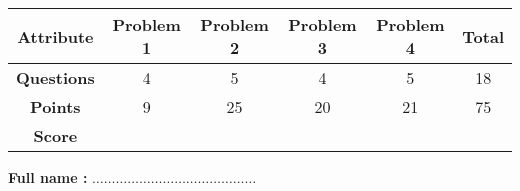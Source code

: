 \documentclass[article,12pt,a4paper]{article}
\newcounter{num}  %
\begin{document}
	\bigskip
	\begin{center}
	\renewcommand{\arraystretch}{2.5} 
	\begin{tabular}{|c|c|c|c|c|c|}
		\hline
		\textbf{Attribute} & \textbf{Problem 1} & \textbf{Problem 2} & \textbf{Problem 3} & \textbf{Problem 4}  & \textbf{\quad Total\quad}  \\
		\hline
		\textbf{Questions} & 4 & 5 & 4 & 5 & 18   \\
		\hline
		\textbf{Points} & 9 & 25 & 20 & 21 & 75   \\
		\hline
		\textbf{Score} & & & & &  \\
		\hline
	\end{tabular}
	
\end{center}
	
	\bigskip
	
	\bigskip
	
	\bigskip
	
	\begin{center}
		\Large{\textbf{Full name : }} $\ldots\ldots\ldots\ldots\ldots\ldots\ldots\ldots\ldots\ldots\ldots\ldots\ldots\ldots$
	\end{center}
	
	
		
	\iffalse
	\stepcounter{num} 
	\paragraph{Problem \thenum.}
	Each time a baseball player bats, he hits the ball with some probability. 
	The table below gives the hit probability and number of chances to bat next season for five players.
	Due to psychological effects of the game, hits do not happen mutually independently. 
	
	player prob. of hit number of chances to bat
	Player A 1/3 300
	Player B 1/4 200
	Player C 1/4 400
	Player D 1/5 250
	Player E 2/5 500
	
	\begin{enumerate}
		\item Let X be the total number times these five players hit the ball next season. Calculate $E[X]$?	
	\end{enumerate}
	\fi
	
	
	
\end{document}
